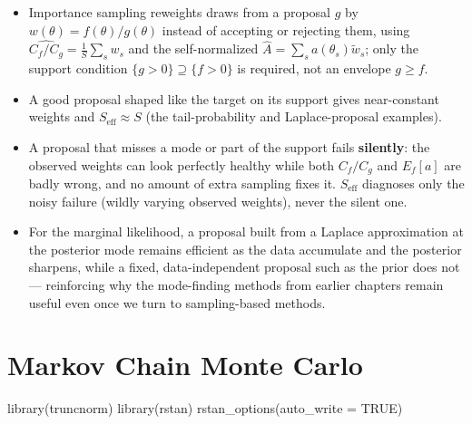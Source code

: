 \documentclass[
  letterpaper,
  DIV=11,
  numbers=noendperiod]{scrreprt}
\newenvironment{Shaded}{\begin{snugshade}}{\end{snugshade}}
\newcommand{\AttributeTok}[1]{\textcolor[rgb]{0.40,0.45,0.13}{#1}}
\newcommand{\ConstantTok}[1]{\textcolor[rgb]{0.56,0.35,0.01}{#1}}
\newcommand{\FunctionTok}[1]{\textcolor[rgb]{0.28,0.35,0.67}{#1}}
\newcommand{\NormalTok}[1]{\textcolor[rgb]{0.00,0.23,0.31}{#1}}
\providecommand{\tightlist}{%
  \setlength{\itemsep}{0pt}\setlength{\parskip}{0pt}}
\begin{document}
\begin{itemize}
\tightlist
\item
  Importance sampling reweights draws from a proposal \(g\) by
  \(w(\theta) = f(\theta)/g(\theta)\) instead of accepting or rejecting
  them, using \(\widehat{C_f/C_g} = \frac1S\sum_s w_s\) and the
  self-normalized \(\hat A = \sum_s a(\theta_s)\tilde w_s\); only the
  support condition \(\{g>0\}\supseteq\{f>0\}\) is required, not an
  envelope \(g \ge f\).
\item
  A good proposal shaped like the target on its support gives
  near-constant weights and \(S_{\text{eff}} \approx S\) (the
  tail-probability and Laplace-proposal examples).
\item
  A proposal that misses a mode or part of the support fails
  \textbf{silently}: the observed weights can look perfectly healthy
  while both \(C_f/C_g\) and \(E_f[a]\) are badly wrong, and no amount
  of extra sampling fixes it. \(S_{\text{eff}}\) diagnoses only the
  noisy failure (wildly varying observed weights), never the silent one.
\item
  For the marginal likelihood, a proposal built from a Laplace
  approximation at the posterior mode remains efficient as the data
  accumulate and the posterior sharpens, while a fixed, data-independent
  proposal such as the prior does not --- reinforcing why the
  mode-finding methods from earlier chapters remain useful even once we
  turn to sampling-based methods.
\end{itemize}


\chapter{Markov Chain Monte Carlo}\label{markov-chain-monte-carlo}

\begin{Shaded}
\begin{Highlighting}[]
\FunctionTok{library}\NormalTok{(truncnorm)}
\FunctionTok{library}\NormalTok{(rstan)}
\FunctionTok{rstan\_options}\NormalTok{(}\AttributeTok{auto\_write =} \ConstantTok{TRUE}\NormalTok{)}
\end{Highlighting}
\end{Shaded}
\end{document}
